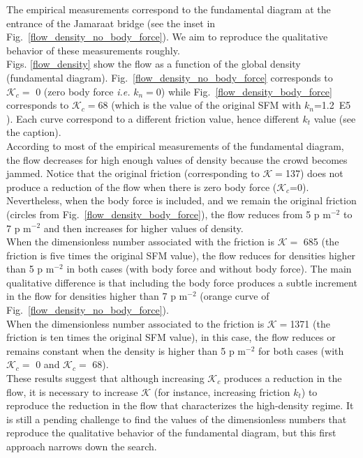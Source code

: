 \documentclass[preprint,12pt]{elsarticle}
\begin{document}
The empirical measurements correspond to the fundamental diagram at the entrance of the Jamaraat bridge (see the inset in Fig.~\ref{flow_density_no_body_force}). We aim to reproduce the qualitative behavior of these measurements roughly.\\

Figs. \ref{flow_density} show the flow as a function of the global density (fundamental diagram). Fig.~\ref{flow_density_no_body_force} corresponds to $\mathcal{K}_c=$ 0 (zero body force \textit{i.e.} $k_n=0$) while Fig.~\ref{flow_density_body_force} corresponds to $\mathcal{K}_c=$68 (which is the value of the original SFM with $k_n$=1.2~E5 ). Each curve correspond to a different friction value, hence different $k_t$ value (see the caption).\\

According to most of the empirical measurements of the fundamental diagram, the flow decreases for high enough values of density because the crowd becomes jammed. Notice that the original friction (corresponding to $\mathcal{K}=$137) does not produce a reduction of the flow when there is zero body force ($\mathcal{K}_c$=0). Nevertheless, when the body force is included, and we remain the original friction (circles from Fig.~\ref{flow_density_body_force}), the flow reduces from  5 p m$^{-2}$ to 7 p m$^{-2}$ and then increases for higher values of density.\\

When the dimensionless number associated with the friction is $\mathcal{K} = $ 685 (the friction is five times the original SFM value), the flow reduces for densities higher than 5 p m$^{-2}$ in both cases (with body force and without body force). The main qualitative difference is that including the body force produces a subtle increment in the flow for densities higher than 7 p m$^{-2}$ (orange curve of Fig.~\ref{flow_density_no_body_force}). \\

When the dimensionless number associated to the friction is $\mathcal{K}=$1371  (the friction is ten times the original SFM value), in this case, the flow reduces or remains constant when the density is higher than 5 p m$^{-2}$ for both cases (with $\mathcal{K}_c=$ 0 and $\mathcal{K}_c = $ 68).\\

These results suggest that although increasing $\mathcal{K}_c$ produces a reduction in the flow, it is necessary to increase $\mathcal{K}$ (for instance, increasing friction $k_t$) to reproduce the reduction in the flow that characterizes the high-density regime. It is still a pending challenge to find the values of the dimensionless numbers that reproduce the qualitative behavior of the fundamental diagram, but this first approach narrows down the search.\\
\end{document}
